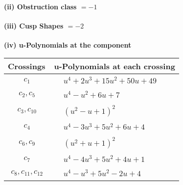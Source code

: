 \documentclass[1p]{elsarticle_modified}
\theoremstyle{definition}
\begin{document}
\flushleft \textbf{(ii) Obstruction class $= -1$}\\~\\
\flushleft \textbf{(iii) Cusp Shapes $= -2$}\\~\\
\newpage\renewcommand{\arraystretch}{1}
\flushleft \textbf{(iv) u-Polynomials at the component}\newline \\
\begin{tabular}{m{50pt}|m{274pt}}
Crossings & \hspace{64pt}u-Polynomials at each crossing \\
\hline $$\begin{aligned}c_{1}\end{aligned}$$&$\begin{aligned}
&u^4+2 u^3+15 u^2+50 u+49
\end{aligned}$\\
\hline $$\begin{aligned}c_{2},c_{5}\end{aligned}$$&$\begin{aligned}
&u^4- u^2+6 u+7
\end{aligned}$\\
\hline $$\begin{aligned}c_{3},c_{10}\end{aligned}$$&$\begin{aligned}
&(u^2- u+1)^2
\end{aligned}$\\
\hline $$\begin{aligned}c_{4}\end{aligned}$$&$\begin{aligned}
&u^4-3 u^3+5 u^2+6 u+4
\end{aligned}$\\
\hline $$\begin{aligned}c_{6},c_{9}\end{aligned}$$&$\begin{aligned}
&(u^2+u+1)^2
\end{aligned}$\\
\hline $$\begin{aligned}c_{7}\end{aligned}$$&$\begin{aligned}
&u^4-4 u^3+5 u^2+4 u+1
\end{aligned}$\\
\hline $$\begin{aligned}c_{8},c_{11},c_{12}\end{aligned}$$&$\begin{aligned}
&u^4- u^3+5 u^2-2 u+4
\end{aligned}$\\
\hline
\end{tabular}\\~\\
\end{document}
